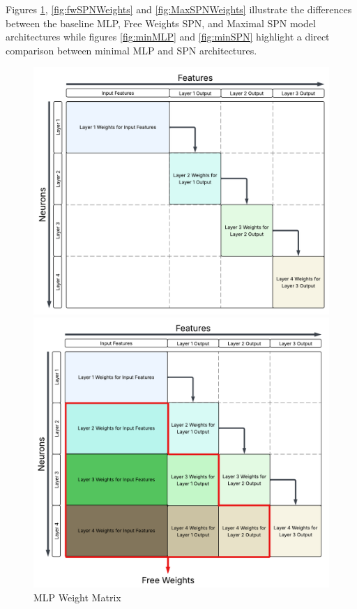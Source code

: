 Figures \ref{fig:MLPWeights}, \ref{fig:fwSPNWeights} and \ref{fig:MaxSPNWeights} illustrate the differences between the baseline MLP, Free Weights SPN, and Maximal SPN model architectures while figures \ref{fig:minMLP} and \ref{fig:minSPN} highlight a direct comparison between minimal MLP and SPN architectures.

\begin{figure}[H]
    \centering
    \begin{minipage}{0.45\textwidth}
        \centering
        \includegraphics[height=0.25\textheight, width=\linewidth]{Figures/Experiments/MLP_weights.png} %
        \captionsetup{width=\linewidth}
        \caption{MLP Weight Matrix}
        \label{fig:MLPWeights}
    \end{minipage}\hfill
    \begin{minipage}{0.45\textwidth}
        \centering
        \includegraphics[height=0.25\textheight, width=\linewidth]{Figures/Experiments/Free_Weights_SPN_Weights.png} %

\end{minipage}
\end{figure}
